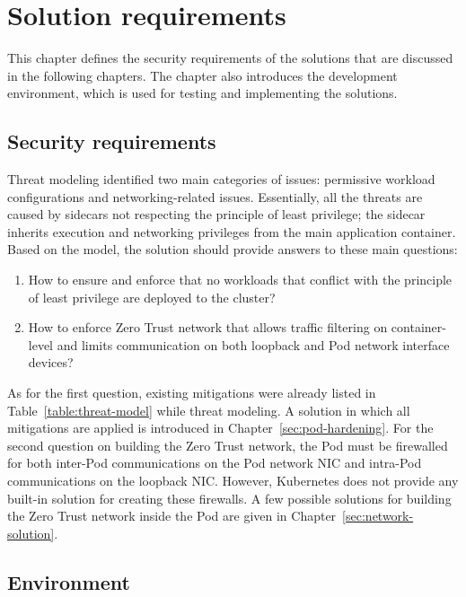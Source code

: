 \documentclass[english, 12pt, a4paper, sci, utf8, a-2b, online]{aaltothesis}
\begin{document}
\clearpage

\section{Solution requirements} \label{sec:methods}

This chapter defines the security requirements of the solutions that are discussed in the following chapters. The chapter also introduces the development environment, which is used for testing and implementing the solutions.

\subsection{Security requirements}

Threat modeling identified two main categories of issues: permissive workload configurations and networking-related issues.
Essentially, all the threats are caused by sidecars not respecting the principle of least privilege; the sidecar inherits execution and networking privileges from the main application container.
Based on the model, the solution should provide answers to these main questions:

\begin{enumerate}
  \item How to ensure and enforce that no workloads that conflict with the principle of least privilege are deployed to the cluster?
  \item How to enforce Zero Trust network that allows traffic filtering on container-level and limits communication on both loopback and Pod network interface devices?
\end{enumerate}

As for the first question, existing mitigations were already listed in Table~\ref{table:threat-model} while threat modeling.
A solution in which all mitigations are applied is introduced in Chapter~\ref{sec:pod-hardening}.
For the second question on building the Zero Trust network, the Pod must be firewalled for both inter-Pod communications on the Pod network NIC and intra-Pod communications on the loopback NIC.
However, Kubernetes does not provide any built-in solution for creating these firewalls.
A few possible solutions for building the Zero Trust network inside the Pod are given in Chapter~\ref{sec:network-solution}.

\subsection{Environment}
\end{document}
